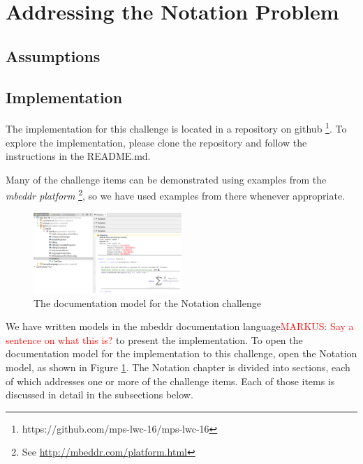 \documentclass[preprint,numbers,10pt]{sigplanconf}
\newcommand\markus[1]{\textcolor{red}{MARKUS: {#1}}}
\begin{document}
\section{Addressing the Notation Problem}

\subsection{Assumptions}

\subsection{Implementation}
The implementation for this challenge is located in a repository on github \footnote{https://github.com/mps-lwc-16/mps-lwc-16}. To explore the implementation, please clone the repository and follow the instructions in the README.md.

Many of the challenge items can be demonstrated using examples from the \emph{mbeddr platform} \footnote{See \url{http://mbeddr.com/platform.html}}, so we have used examples from there whenever appropriate.

\begin{figure}[H]
	\centering
	\includegraphics[width=0.50\textwidth]{screens/OpenNotation.png}
	\caption{The documentation model for the Notation challenge}
	\label{fig:opennotation}
\end{figure}

We have written models in the mbeddr documentation language\markus{Say a
sentence on what this is?} to present the implementation. To open the
documentation model for the implementation to this challenge, open the Notation
model, as shown in Figure \ref{fig:opennotation}. The Notation chapter is
divided into sections, each of which addresses one or more of the challenge
items. Each of those items is discussed in detail in the subsections below.
\end{document}
